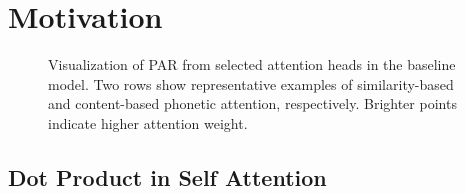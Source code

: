 \section{Motivation}\label{sec:motivation}

\begin{figure}[t]
    \centering
    \caption{Visualization of PAR from selected attention heads in the baseline model.
    Two rows show representative examples of similarity-based and content-based phonetic attention, respectively.
    Brighter points indicate higher attention weight.}
    \label{fig:par}
\end{figure}

\subsection{Dot Product in Self Attention}\label{ssec:sa}

